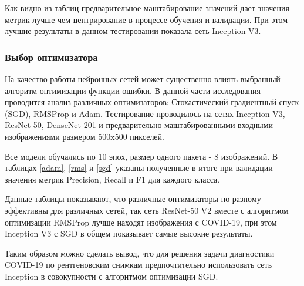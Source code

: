 

Как видно из таблиц предварительное маштабирование значений дает значения метрик лучше чем центрирование в процессе обучения и валидации. При этом лучшие результаты в данном тестировании показала сеть Inception V3.

\subsubsection{Выбор оптимизатора}
На качество работы нейронных сетей может существенно влиять выбранный алгоритм оптимизации функции ошибки. В данной части исследования проводится анализ различных оптимизаторов: Стохастический градиентный спуск (SGD), RMSProp и Adam. Тестирование проводилось на сетях Inception V3, ResNet-50, DenseNet-201 и предварительно маштабированными входными изображениями размером 500x500 пикселей.  

Все модели обучались по 10 эпох, размер одного пакета ­- 8 изображений. В таблицах \ref{adam}, \ref{rms} и \ref{sgd} указаны полученные в итоге при валидации значения метрик Precision, Recall и F1 для каждого класса.





Данные таблицы показывают, что различные оптимизаторы по разному эффективны для различных сетей, так сеть ResNet-50 V2 вместе с алгоритмом оптимизации RMSProp лучше находят изображения с COVID-19, при этом Inception V3 с SGD в общем показывает самые высокие результаты. 

Таким образом можно сделать вывод, что для решения задачи диагностики COVID-19 по рентгеновским снимкам предпочтительно использовать сеть Inception в совокупности с алгоритмом оптимизации SGD.




\clearpage